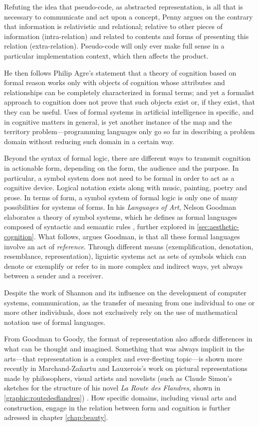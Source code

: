 Refuting the idea that pseudo-code, as abstracted representation, is all that is necessary to communicate and act upon a concept, Penny  argues on the contrary that information is relativistic and relational; relative to other pieces of information (intra-relation) and related to contents and forms of presenting this relation (extra-relation). Pseudo-code will only ever make full sense in a particular implementation context, which then affects the product.

He then follows Philip Agre's statement that a theory of cognition based on formal reason works only with objects of cognition whose attributes and relationships can be completely characterized in formal terms; and yet a formalist approach to cognition does not prove that such objects exist or, if they exist, that they can be useful. Uses of formal systems in artificial intelligence in specific, and in cognitive matters in general, is yet another instance of the map and the territory problem—programming languages only go so far in describing a problem domain without reducing such domain in a certain way.

Beyond the syntax of formal logic, there are different ways to transmit cognition in actionable form, depending on the form, the audience and the purpose. In particular, a symbol system does not need to be formal in order to act as a cognitive device. Logical notation exists along with music, painting, poetry and prose. In terms of form, a symbol system of formal logic is only one of many possibilities for systems of forms. In his \emph{Languages of Art}, Nelson Goodman elaborates a theory of symbol systems, which he defines as formal languages composed of syntactic and semantic rules \citep{goodman_languages_1976}, further explored in \ref{sec:aesthetic-cognition}. What follows, argues Goodman, is that all these formal languages involve an act of \emph{reference}. Through different means (exemplification, denotation, resemblance, representation), liguistic systems act as sets of symbols which can denote or exemplify or refer to in more complex and indirect ways, yet always between a sender and a receiver.

Despite the work of Shannon \citep{shannon_mathematical_2001} and its influence on the development of computer systems, communication, as the transfer of meaning from one individual to one or more other individuals, does not exclusively rely on the use of mathematical notation use of formal languages.

From Goodman to Goody, the format of representation also affords differences in what can be thought and imagined. Something that was always implicit in the arts—that representation is a complex and ever-fleeting topic—is shown more recently in Marchand-Zañartu and Lauxerois's work on pictural representations made by philosophers, visual artists and novelists (such as Claude Simon's sketches for the structure of his novel \emph{La Route des Flandres}, shown in \ref{graphic:routedesflandres}) \citep{marchand-zanartu_32_2022}. How specific domains, including  visual arts and construction, engage in the relation between form and cognition is further adressed in chapter \ref{chap:beauty}.


